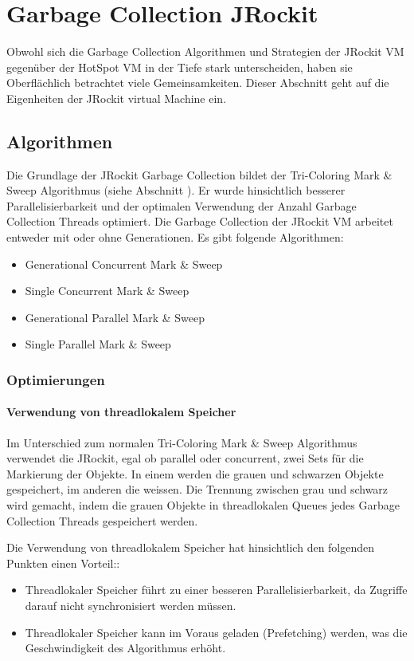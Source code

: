 \chapter{Garbage Collection JRockit}\label{jrockit garbage collection}
Obwohl sich die Garbage Collection Algorithmen und Strategien der JRockit VM gegenüber der HotSpot VM in der Tiefe stark unterscheiden, haben sie Oberflächlich betrachtet viele Gemeinsamkeiten. Dieser Abschnitt geht auf die Eigenheiten der JRockit virtual Machine ein. 

\section{Algorithmen}
Die Grundlage der JRockit Garbage Collection bildet der Tri-Coloring Mark \& Sweep Algorithmus (siehe Abschnitt ). Er wurde hinsichtlich besserer Parallelisierbarkeit und der optimalen Verwendung der Anzahl Garbage Collection Threads optimiert. Die Garbage Collection der JRockit VM arbeitet entweder mit oder ohne Generationen. Es gibt folgende Algorithmen:

\begin{itemize}
	\item Generational Concurrent Mark \& Sweep
	\item Single Concurrent Mark \& Sweep
	\item Generational Parallel Mark \& Sweep	
	\item Single Parallel Mark \& Sweep
\end{itemize}

\subsection{Optimierungen}
\subsubsection{Verwendung von threadlokalem Speicher}
Im Unterschied zum normalen Tri-Coloring Mark \& Sweep Algorithmus verwendet die JRockit, egal ob parallel oder concurrent, zwei Sets für die Markierung der Objekte. In einem werden die grauen und schwarzen Objekte gespeichert, im anderen die weissen. Die Trennung zwischen grau und schwarz wird gemacht, indem die grauen Objekte in threadlokalen Queues jedes Garbage Collection Threads gespeichert werden. 

Die Verwendung von threadlokalem Speicher hat hinsichtlich den folgenden Punkten einen Vorteil:\cite[S. 79]{lagergren2010oracle}:
\begin{itemize}
	\item Threadlokaler Speicher führt zu einer besseren Parallelisierbarkeit, da Zugriffe darauf nicht synchronisiert werden müssen.
	\item Threadlokaler Speicher kann im Voraus geladen (Prefetching) werden, was die Geschwindigkeit des Algorithmus erhöht.
\end{itemize}

